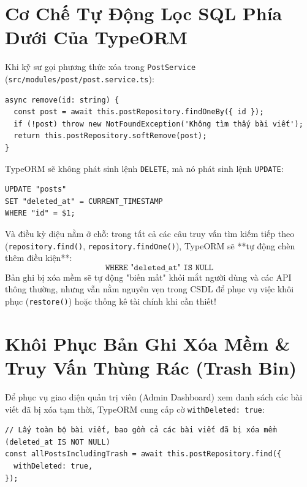 \documentclass[12pt,a4paper,oneside]{book}
\begin{document}
\section{Cơ Chế Tự Động Lọc SQL Phía Dưới Của TypeORM}
Khi kỹ sư gọi phương thức xóa trong \texttt{PostService} (\texttt{src/modules/post/post.service.ts}):
\begin{codebox}
\begin{Verbatim}[fontsize=\small]
async remove(id: string) {
  const post = await this.postRepository.findOneBy({ id });
  if (!post) throw new NotFoundException('Không tìm thấy bài viết');
  return this.postRepository.softRemove(post);
}
\end{Verbatim}
\end{codebox}

TypeORM sẽ không phát sinh lệnh \texttt{DELETE}, mà nó phát sinh lệnh \texttt{UPDATE}:
\begin{codebox}
\begin{Verbatim}[fontsize=\small]
UPDATE "posts"
SET "deleted_at" = CURRENT_TIMESTAMP
WHERE "id" = $1;
\end{Verbatim}
\end{codebox}

Và điều kỳ diệu nằm ở chỗ: trong tất cả các câu truy vấn tìm kiếm tiếp theo (\texttt{repository.find()}, \texttt{repository.findOne()}), TypeORM sẽ **tự động chèn thêm điều kiện**:
\begin{equation}
  \texttt{WHERE "deleted\_at" IS NULL}
\end{equation}
Bản ghi bị xóa mềm sẽ tự động "biến mất" khỏi mắt người dùng và các API thông thường, nhưng vẫn nằm nguyên vẹn trong CSDL để phục vụ việc khôi phục (\texttt{restore()}) hoặc thống kê tài chính khi cần thiết!

\section{Khôi Phục Bản Ghi Xóa Mềm \& Truy Vấn Thùng Rác (Trash Bin)}
Để phục vụ giao diện quản trị viên (Admin Dashboard) xem danh sách các bài viết đã bị xóa tạm thời, TypeORM cung cấp cờ \texttt{withDeleted: true}:
\begin{codebox}
\begin{Verbatim}[fontsize=\small]
// Lấy toàn bộ bài viết, bao gồm cả các bài viết đã bị xóa mềm (deleted_at IS NOT NULL)
const allPostsIncludingTrash = await this.postRepository.find({
  withDeleted: true,
});
\end{Verbatim}
\end{codebox}
\end{document}
